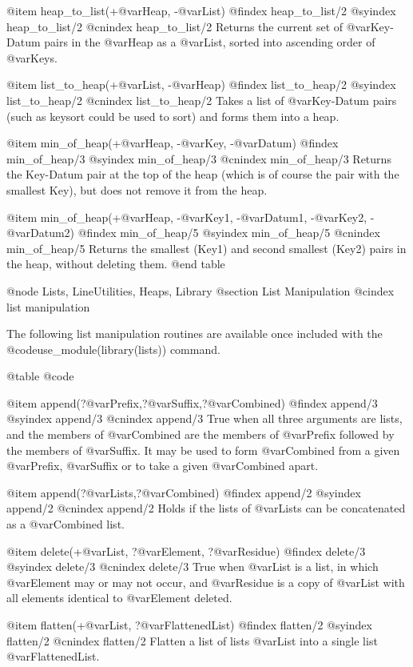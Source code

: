 {{{{{{{{@item heap_to_list(+@var{Heap}, -@var{List})
@findex heap_to_list/2
@syindex        heap_to_list/2
@cnindex        heap_to_list/2
Returns the current set of @var{Key-Datum} pairs in the @var{Heap} as a
@var{List}, sorted into ascending order of @var{Keys}.

@item list_to_heap(+@var{List}, -@var{Heap})
@findex list_to_heap/2
@syindex        list_to_heap/2
@cnindex        list_to_heap/2
Takes a list of @var{Key-Datum} pairs (such as keysort could be used to sort)
and forms them into a heap.

@item min_of_heap(+@var{Heap},  -@var{Key},  -@var{Datum})
@findex min_of_heap/3
@syindex min_of_heap/3
@cnindex min_of_heap/3
Returns the Key-Datum pair at the top of the heap (which is of course
the pair with the smallest Key), but does not remove it from the heap.

@item min_of_heap(+@var{Heap},  -@var{Key1},  -@var{Datum1},
-@var{Key2},  -@var{Datum2})
@findex min_of_heap/5
@syindex min_of_heap/5
@cnindex min_of_heap/5
Returns the smallest (Key1) and second smallest (Key2) pairs in the
heap, without deleting them.
@end table

@node Lists, LineUtilities, Heaps, Library
@section List Manipulation
@cindex list manipulation

The following list manipulation routines are available once included
with the @code{use_module(library(lists))} command. 

@table @code

@item append(?@var{Prefix},?@var{Suffix},?@var{Combined})
@findex append/3
@syindex append/3
@cnindex append/3
True when all three arguments are lists, and the members of
@var{Combined} are the members of @var{Prefix} followed by the members of @var{Suffix}.
It may be used to form @var{Combined} from a given @var{Prefix}, @var{Suffix} or to take
a given @var{Combined} apart.

@item append(?@var{Lists},?@var{Combined})
@findex append/2
@syindex append/2
@cnindex append/2
Holds if the lists of @var{Lists} can be concatenated as a
@var{Combined} list.

@item delete(+@var{List}, ?@var{Element}, ?@var{Residue})
@findex delete/3
@syindex delete/3
@cnindex delete/3
True when @var{List} is a list, in which @var{Element} may or may not
occur, and @var{Residue} is a copy of @var{List} with all elements
identical to @var{Element} deleted.

@item flatten(+@var{List}, ?@var{FlattenedList})
@findex flatten/2
@syindex flatten/2
@cnindex flatten/2
Flatten a list of lists @var{List} into a single list
@var{FlattenedList}.

}}}}}}}}
